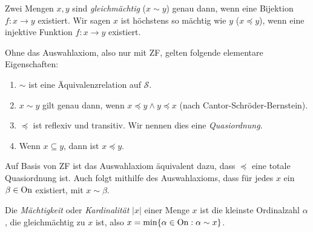 \begin{definition}
	Zwei Mengen $x,y$ sind \textit{gleichmächtig} ($x\sim y$) genau dann, wenn eine Bijektion $f:x\to y$ existiert. Wir sagen $x$ ist höchstens so mächtig wie $y$ ($x\preceq y$), wenn eine injektive Funktion $f:x\to y$ existiert.
\end{definition}

\begin{lemma}
	Ohne das Auswahlaxiom, also nur mit ZF, gelten folgende elementare Eigenschaften:
	\begin{enumerate}
		\item $\sim$ ist eine Äquivalenzrelation auf $\mathcal{S}$.
		\item $x\sim y$ gilt genau dann, wenn $x\preceq y \land y \preceq x$ (nach Cantor-Schröder-Bernstein).
		\item $\preceq$ ist reflexiv und transitiv. Wir nennen dies eine \textit{Quasiordnung}.
		\item Wenn $x\subseteq y$, dann ist $x\preceq y$.
	\end{enumerate}
\end{lemma}

Auf Basis von ZF ist das Auswahlaxiom äquivalent dazu, dass $\preceq$ eine totale Quasiordnung ist. Auch folgt mithilfe des Auswahlaxioms, dass für jedes $x$ ein $\beta\in \operatorname{On}$ existiert, mit $x\sim\beta$.

\begin{definition}[Kardinalität]
	Die \textit{Mächtigkeit} oder \textit{Kardinalität} $\vert x \vert$ einer Menge $x$ ist die kleinste Ordinalzahl $\alpha$, die gleichmächtig zu $x$ ist, also $x=\min\{\alpha\in \operatorname{On} : \alpha\sim x\}$.
\end{definition}

